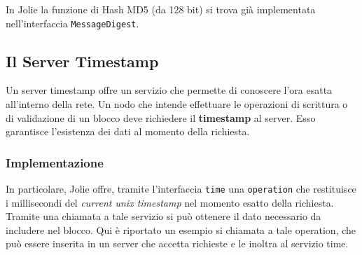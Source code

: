 %

%

\noindent In Jolie la funzione di Hash MD5 (da 128 bit) si trova già implementata nell'interfaccia \texttt{MessageDigest}.
%

%

\subsection{Il Server Timestamp}
Un server timestamp offre un servizio che permette di conoscere l'ora esatta all'interno della rete. Un nodo che intende effettuare le operazioni di scrittura o di validazione di un blocco deve richiedere il \textbf{timestamp} al server. Esso garantisce l'esistenza dei dati al momento della richiesta.

\subsubsection{Implementazione}
In particolare, Jolie offre, tramite l'interfaccia \texttt{time} una \texttt{operation} che restituisce i millisecondi del \textit{current unix timestamp} nel momento esatto della richiesta. Tramite una chiamata a tale servizio si può ottenere il dato necessario da includere nel blocco. Qui è riportato un esempio si chiamata a tale operation, che può essere inserita in un server che accetta richieste e le inoltra al servizio time.
%

%

